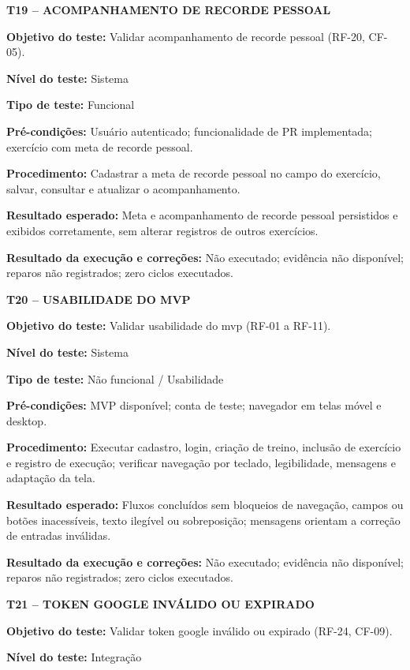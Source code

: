 \textbf{T19 -- ACOMPANHAMENTO DE RECORDE PESSOAL}

\noindent\textbf{Objetivo do teste:} Validar acompanhamento de recorde pessoal (RF-20, CF-05).

\noindent\textbf{Nível do teste:} Sistema

\noindent\textbf{Tipo de teste:} Funcional

\noindent\textbf{Pré-condições:} Usuário autenticado; funcionalidade de PR implementada; exercício com meta de recorde pessoal.

\noindent\textbf{Procedimento:} Cadastrar a meta de recorde pessoal no campo do exercício, salvar, consultar e atualizar o acompanhamento.

\noindent\textbf{Resultado esperado:} Meta e acompanhamento de recorde pessoal persistidos e exibidos corretamente, sem alterar registros de outros exercícios.

\noindent\textbf{Resultado da execução e correções:} Não executado; evidência não disponível; reparos não registrados; zero ciclos executados.

\textbf{T20 -- USABILIDADE DO MVP}

\noindent\textbf{Objetivo do teste:} Validar usabilidade do mvp (RF-01 a RF-11).

\noindent\textbf{Nível do teste:} Sistema

\noindent\textbf{Tipo de teste:} Não funcional / Usabilidade

\noindent\textbf{Pré-condições:} MVP disponível; conta de teste; navegador em telas móvel e desktop.

\noindent\textbf{Procedimento:} Executar cadastro, login, criação de treino, inclusão de exercício e registro de execução; verificar navegação por teclado, legibilidade, mensagens e adaptação da tela.

\noindent\textbf{Resultado esperado:} Fluxos concluídos sem bloqueios de navegação, campos ou botões inacessíveis, texto ilegível ou sobreposição; mensagens orientam a correção de entradas inválidas.

\noindent\textbf{Resultado da execução e correções:} Não executado; evidência não disponível; reparos não registrados; zero ciclos executados.

\textbf{T21 -- TOKEN GOOGLE INVÁLIDO OU EXPIRADO}

\noindent\textbf{Objetivo do teste:} Validar token google inválido ou expirado (RF-24, CF-09).

\noindent\textbf{Nível do teste:} Integração

